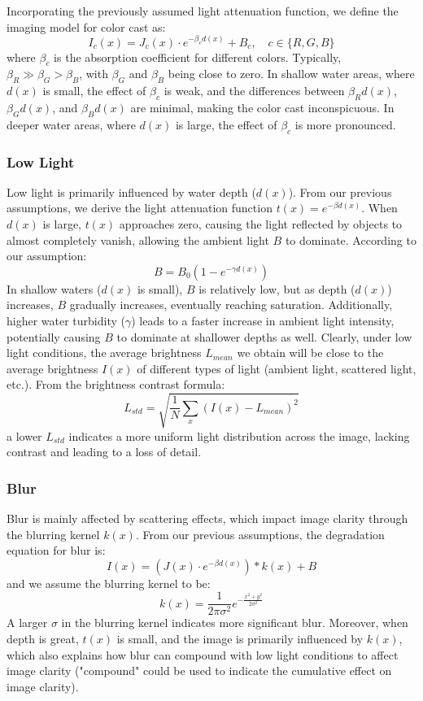 \documentclass[11pt]{ctexart}
\begin{document}
    Incorporating the previously assumed light attenuation function, we define the imaging model for color cast as:
    \[ I_c(x) = J_c(x) \cdot e^{-\beta_c d(x)} + B_c, \quad c \in \{R, G, B\} \]
    where \( \beta_c \) is the absorption coefficient for different colors. Typically, \( \beta_R \gg \beta_G > \beta_B \), with \( \beta_G \) and \( \beta_B \) being close to zero.
    In shallow water areas, where \( d(x) \) is small, the effect of \( \beta_c \) is weak, and the differences between \( \beta_R d(x) \), \( \beta_G d(x) \), and \( \beta_B d(x) \) are minimal, making the color cast inconspicuous.
    In deeper water areas, where \( d(x) \) is large, the effect of \( \beta_c \) is more pronounced.

    \subsubsection{Low Light}
    Low light is primarily influenced by water depth (\( d(x) \)).
    From our previous assumptions, we derive the light attenuation function \( t(x) = e^{-\beta d(x)} \). When \( d(x) \) is large, \( t(x) \) approaches zero, causing the light reflected by objects to almost completely vanish,
    allowing the ambient light \( B \) to dominate. According to our assumption:
    \[ B = B_0(1 - e^{-\gamma d(x)}) \]
    In shallow waters (\( d(x) \) is small), \( B \) is relatively low, but as depth (\( d(x) \)) increases,
    \( B \) gradually increases, eventually reaching saturation. Additionally, higher water turbidity (\( \gamma \)) leads to a faster increase in ambient light intensity, potentially causing \( B \) to dominate at shallower depths as well.
    Clearly, under low light conditions, the average brightness \( L_{mean} \) we obtain will be close to the average brightness \( I(x) \) of different types of light (ambient light, scattered light, etc.). From the brightness contrast formula:
    \[ L_{std} = \sqrt{\frac{1}{N} \sum_{x} (I(x) - L_{mean})^2} \]
    a lower \( L_{std} \) indicates a more uniform light distribution across the image, lacking contrast and leading to a loss of detail.

    \subsubsection{Blur}
    Blur is mainly affected by scattering effects, which impact image clarity through the blurring kernel \( k(x) \).
    From our previous assumptions, the degradation equation for blur is:
    \[ I(x) = (J(x) \cdot e^{-\beta d(x)}) * k(x) + B \]
    and we assume the blurring kernel to be:
    \[ k(x) = \frac{1}{2\pi\sigma^2} e^{-\frac{x^2 + y^2}{2\sigma^2}} \]
    A larger \( \sigma \) in the blurring kernel indicates more significant blur.
    Moreover, when depth is great, \( t(x) \) is small, and the image is primarily influenced by \( k(x) \), which also explains how blur can compound with low light conditions to affect image clarity ("compound" could be used to indicate the cumulative effect on image clarity).
\end{document}
